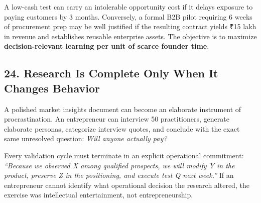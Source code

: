 A low-cash test can carry an intolerable opportunity cost if it delays exposure to paying customers by 3 months. Conversely, a formal B2B pilot requiring 6 weeks of procurement prep may be well justified if the resulting contract yields ₹15 lakh in revenue and establishes reusable enterprise assets. The objective is to maximize \textbf{decision-relevant learning per unit of scarce founder time}.

\subsection*{24. Research Is Complete Only When It Changes Behavior}

A polished market insights document can become an elaborate instrument of procrastination. An entrepreneur can interview 50 practitioners, generate elaborate personas, categorize interview quotes, and conclude with the exact same unresolved question: \emph{Will anyone actually pay?}

Every validation cycle must terminate in an explicit operational commitment: \emph{``Because we observed X among qualified prospects, we will modify Y in the product, preserve Z in the positioning, and execute test Q next week.''} If an entrepreneur cannot identify what operational decision the research altered, the exercise was intellectual entertainment, not entrepreneurship.
